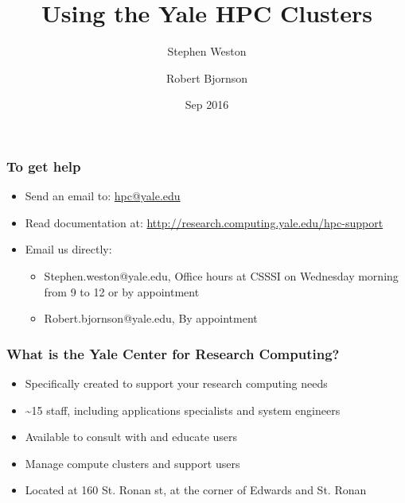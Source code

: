 \documentclass[10pt]{beamer}
\title{Using the Yale HPC Clusters}
\author{{Stephen Weston} \and {Robert Bjornson}}
\institute[Yale]{
  Yale Center for Research Computing \\
  Yale University
}
\date{Sep 2016}
\begin{document}
\begin{frame}[plain]
  \titlepage
\end{frame}

\begin{frame}
\frametitle{To get help}
\begin{itemize}
\item Send an email to: \url{hpc@yale.edu}
\item Read documentation at: \url{http://research.computing.yale.edu/hpc-support}
\item Email us directly:
\begin{itemize}
\item Stephen.weston@yale.edu, Office hours at CSSSI on Wednesday morning from 9 to 12 or by appointment
\item Robert.bjornson@yale.edu, By appointment
\end{itemize}
\end{itemize}
\end{frame}

\begin{frame}[fragile]
\frametitle{What is the Yale Center for Research Computing?}

\begin{itemize}
\item Specifically created to support your research computing needs
\item \textasciitilde 15 staff, including applications specialists and system engineers
\item Available to consult with and educate users
\item Manage compute clusters and support users
\item Located at 160 St. Ronan st, at the corner of Edwards and St. Ronan
\end{itemize}

\end{frame}
\end{document}
